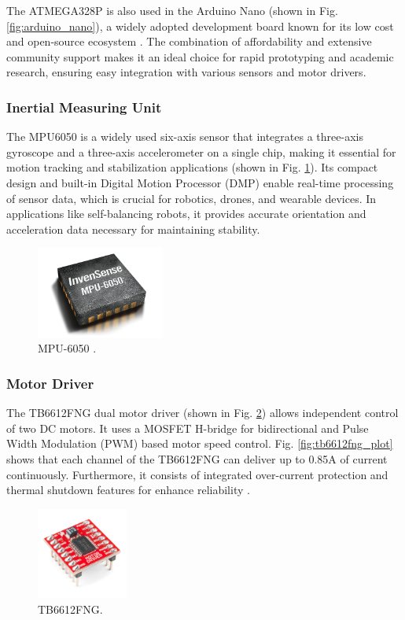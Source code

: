 \documentclass{article}
\begin{document}
The ATMEGA328P is also used in the Arduino Nano (shown in Fig. \ref{fig:arduino_nano}), a widely adopted development board known for its low cost and open-source ecosystem \cite{arduino_nano}. The combination of affordability and extensive community support makes it an ideal choice for rapid prototyping and academic research, ensuring easy integration with various sensors and motor drivers. 


\subsubsection{Inertial Measuring Unit}
The MPU6050 is a widely used six-axis sensor that integrates a three-axis gyroscope and a three-axis accelerometer on a single chip, making it essential for motion tracking and stabilization applications (shown in Fig. \ref{fig:mpu-6050}). Its compact design and built-in Digital Motion Processor (DMP) enable real-time processing of sensor data, which is crucial for robotics, drones, and wearable devices.
In applications like self-balancing robots, it provides accurate orientation and acceleration data necessary for maintaining stability. 
\begin{figure}[h]
    \centering
    \includegraphics[height=3cm]{assets/mpu-6050.png}
    \caption{MPU-6050 \cite{mpu6050}.}
    \label{fig:mpu-6050}
\end{figure}

\subsubsection{Motor Driver}
The TB6612FNG dual motor driver (shown in Fig. \ref{fig:tb6612fng}) allows independent control of two DC motors. It uses a MOSFET H-bridge for bidirectional and Pulse Width Modulation (PWM) based motor speed control. Fig. \ref{fig:tb6612fng_plot} shows that each channel of the TB6612FNG can deliver up to 0.85A of current continuously. Furthermore, it consists of integrated over-current protection and thermal shutdown features for enhance reliability \cite{TB6612FNG}.

\begin{figure}[h]
	\centering
	\includegraphics[height=3cm]{assets/TB6612FNG.jpg}
	\caption{TB6612FNG\cite{TB6612FNG_photo}.}
	\label{fig:tb6612fng}
\end{figure}
\end{document}
